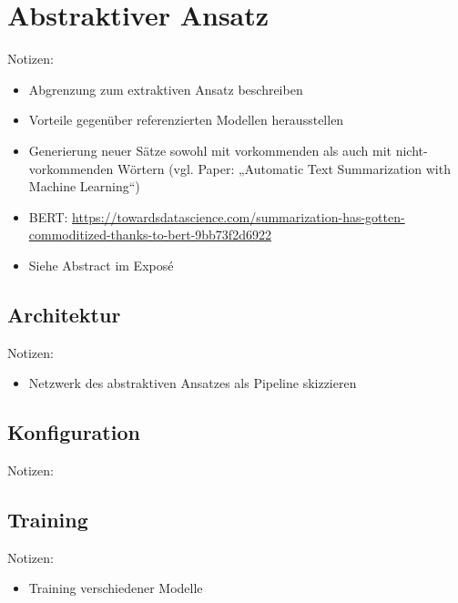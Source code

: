 \chapter{Abstraktiver Ansatz}
\thispagestyle{fancy}
\label{chap:Abstraktiver Ansatz}

Notizen:
\begin{itemize}
	\item Abgrenzung zum extraktiven Ansatz beschreiben
	\item Vorteile gegenüber referenzierten Modellen herausstellen
	\item Generierung neuer Sätze sowohl mit vorkommenden als auch mit nicht-vorkommenden Wörtern (vgl. Paper: „Automatic Text Summarization with Machine Learning“)
	\item BERT: \url{https://towardsdatascience.com/summarization-has-gotten-commoditized-thanks-to-bert-9bb73f2d6922}
	\item Siehe Abstract im Exposé
\end{itemize}


\section{Architektur}
Notizen:
\begin{itemize}
	\item Netzwerk des abstraktiven Ansatzes als Pipeline skizzieren
\end{itemize}


\section{Konfiguration}
Notizen:


\section{Training}
Notizen:
\begin{itemize}
	\item Training verschiedener Modelle
\end{itemize}


